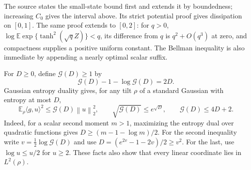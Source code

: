 \documentclass[11pt]{article}
\theoremstyle{remark}
\newcommand{\E}{\mathbb E}
\newcommand{\Gain}{\mathcal G}
\newcommand{\norm}[1]{\left\lVert #1\right\rVert}
\begin{document}
The source states the small-state bound first and extends it by
boundedness; increasing $C_0$ gives the interval above. Its strict
potential proof gives dissipation on $[0,1]$. The same proof extends
to $[0,2]$: for $q>0$,
$\log\E\exp\{\tanh^2(\sqrt q Z)\}<q$, its difference from $q$ is
$q^2+O(q^3)$ at zero, and compactness supplies a positive uniform
constant. The Bellman inequality is also immediate by appending a
nearly optimal scalar suffix.

For $D\ge0$, define $\Gain(D)\ge1$ by
\[
 \Gain(D)-1-\log\Gain(D)=2D.
\]
Gaussian entropy duality gives, for any tilt $\rho$ of a standard
Gaussian with entropy at most $D$,
\begin{equation}
 \E_\rho\langle g,u\rangle^2\le\Gain(D)\norm u_2^2,
 \qquad \sqrt{\Gain(D)}\le e^{\sqrt D},
 \qquad \Gain(D)\le4D+2.
 \label{eq:critical-gain}
\end{equation}
Indeed, for a scalar second moment $m>1$, maximizing the entropy
dual over quadratic functions gives
$D\ge(m-1-\log m)/2$. For the second inequality write
$v=\tfrac12\log\Gain(D)$ and use
$D=(e^{2v}-1-2v)/2\ge v^2$. For the last, use
$\log u\le u/2$ for $u\ge2$. These facts also show that every
linear coordinate lies in $L^2(\rho)$.
\end{document}
